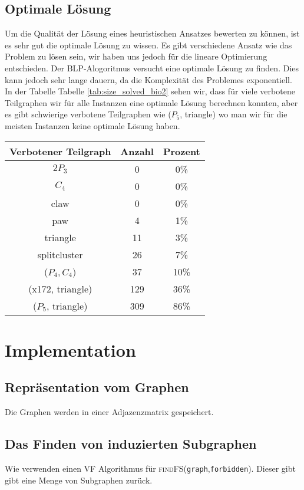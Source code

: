 \documentclass[12pt,a4paper,onecolumn,oneside,titlepage]{article}
\newcommand{\vars}{\texttt}
\newcommand{\func}{\textsc}
\begin{document}
\subsection{Optimale Lösung}
Um die Qualität der Lösung eines heuristischen Ansatzes bewerten zu können, ist es sehr gut die optimale Lösung zu wissen. Es gibt verschiedene Ansatz wie das Problem zu lösen sein, wir haben uns jedoch für die lineare Optimierung entschieden. Der BLP-Alogoritmus versucht eine optimale Lösung zu finden. Dies kann jedoch sehr lange dauern, da die Komplexität des Problemes exponentiell. 
In der Tabelle Tabelle \ref{tab:size_solved_bio2} sehen wir, dass für viele verbotene Teilgraphen wir für alle Instanzen eine optimale Lösung berechnen konnten, aber es gibt schwierige verbotene Teilgraphen wie ($P_5$, triangle) wo man wir für die meisten Instanzen keine optimale Lösung haben.
\begin{center}
\label{tab:size_solved_bio2}
\begin{tabular}{|c|c|c|}
\hline 
Verbotener Teilgraph & Anzahl & Prozent \\ 
\hline 
$2 P_3$ & 0 & 0\% \\ 
\hline 
$C_4$ & 0 & 0\% \\ 
\hline 
claw & 0 & 0\% \\ 
\hline 
paw & 4 & 1\% \\ 
\hline 
triangle & 11 & 3\% \\ 
\hline 
splitcluster & 26 & 7\% \\ 
\hline 
($P_4,C_4)$ & 37 & 10\% \\ 
\hline 
(x172, triangle) & 129 & 36\% \\ 
\hline 
($P_5$, triangle)& 309 & 86\% \\ 
\hline 
\end{tabular} 
\end{center}


\section{Implementation}
\label{sec:implementation}
\subsection{Repräsentation vom Graphen}
Die Graphen werden in einer Adjazenzmatrix gespeichert.


\subsection{Das Finden von induzierten Subgraphen}
\cite{Ullmann76}
Wie verwenden einen VF Algorithmus für \func{findFS}(\vars{graph},\vars{forbidden}).
Dieser gibt gibt eine Menge von Subgraphen zurück.
\end{document}

